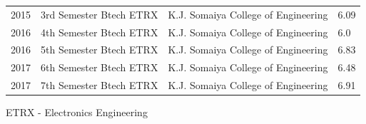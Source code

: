 \documentclass[letterpaper,11pt]{article}
\begin{document}
\begin{table}[h!]
\begin{center}
\begin{tabular}{l|c|r|l}
		2015 & \hspace{0.2cm} 3rd Semester Btech ETRX \hspace{0.2cm} & \hspace{0.2cm}K.J. Somaiya College of Engineering\hspace{0.2cm} & \hspace{1.2cm} 6.09 \hspace{0.2cm}\\
		2016 & \hspace{0.2cm} 4th Semester Btech ETRX \hspace{0.2cm} & \hspace{0.2cm}K.J. Somaiya College of Engineering\hspace{0.2cm} & \hspace{1.2cm} 6.0 \hspace{0.2cm}\\
		2016 & \hspace{0.2cm} 5th Semester Btech ETRX \hspace{0.2cm} & \hspace{0.2cm}K.J. Somaiya College of Engineering\hspace{0.2cm} & \hspace{1.2cm} 6.83 \hspace{0.2cm}\\
		2017 & \hspace{0.2cm} 6th Semester Btech ETRX \hspace{0.2cm} & \hspace{0.2cm}K.J. Somaiya College of Engineering\hspace{0.2cm} & \hspace{1.2cm} 6.48 \hspace{0.2cm}\\
		2017 & \hspace{0.2cm} 7th Semester Btech ETRX \hspace{0.2cm} & \hspace{0.2cm}K.J. Somaiya College of Engineering\hspace{0.2cm} & \hspace{1.2cm} 6.91 \hspace{0.2cm}\\
		      
          \end{tabular}
  \end{center}
\end{table}

ETRX - Electronics Engineering \\
\end{document}
